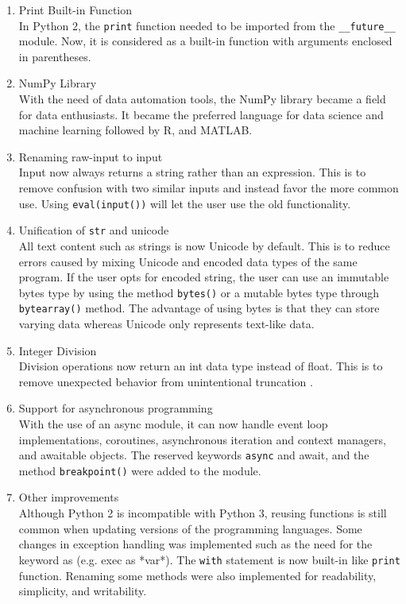 \documentclass{article}
\begin{document}
\begin{enumerate}

    \item Print Built-in Function\\
    In Python 2, the \texttt{print} function needed to be imported from the \verb|__future__| module. Now, it is considered as a built-in function with arguments enclosed in parentheses.

    \item NumPy Library\\
    With the need of data automation tools, the NumPy library became a field for data enthusiasts. It became the preferred language for data science and machine learning followed by R, and MATLAB.

    \item Renaming raw-input to input\\
    Input now always returns a string rather than an expression. This is to remove confusion with two similar inputs and instead favor the more common use. Using \texttt{eval(input())} will let the user use the old functionality.

    \item Unification of \texttt{str} and unicode\\
    All text content such as strings is now Unicode by default. This is to reduce errors caused by mixing Unicode and encoded data types of the same program. If the user opts for encoded string, the user can use an immutable bytes type by using the method \texttt{bytes()} or a mutable bytes type through \texttt{bytearray()} method. The advantage of using bytes is that they can store varying data whereas Unicode only represents text-like data.

    \item Integer Division\\
    Division operations now return an int data type instead of float. This is to remove unexpected behavior from unintentional truncation \parencite{thelin_2021}.

    \item Support for asynchronous programming\\
    With the use of an async module, it can now handle event loop implementations, coroutines, asynchronous iteration and context managers, and awaitable objects. The reserved keywords \texttt{async} and await, and the method \texttt{breakpoint()} were added to the module.

    \item Other improvements\\
    Although Python 2 is incompatible with Python 3, reusing functions is still common when updating versions of the programming languages. Some changes in exception handling was implemented such as the need for the keyword as (e.g. exec as *var*). The \texttt{with} statement is now built-in like \texttt{print} function. Renaming some methods were also implemented for readability, simplicity, and writability.

\end{enumerate}
\end{document}
